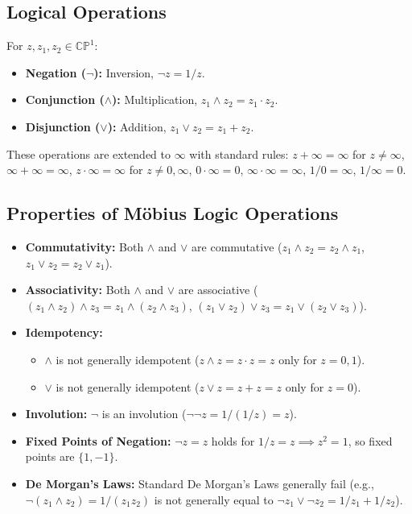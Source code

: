 	\subsection{Logical Operations}
	For $z, z_1, z_2 \in \mathbb{CP}^1$:
	\begin{itemize}
		\item \textbf{Negation ($\neg$):} Inversion, $\neg z = 1/z$.
		\item \textbf{Conjunction ($\wedge$):} Multiplication, $z_1 \wedge z_2 = z_1 \cdot z_2$.
		\item \textbf{Disjunction ($\vee$):} Addition, $z_1 \vee z_2 = z_1 + z_2$.
	\end{itemize}
	These operations are extended to $\infty$ with standard rules: $z+\infty = \infty$ for $z \neq \infty$, $\infty+\infty=\infty$, $z \cdot \infty = \infty$ for $z \neq 0, \infty$, $0 \cdot \infty = 0$, $\infty \cdot \infty = \infty$, $1/0 = \infty$, $1/\infty = 0$.

	\subsection{Properties of Möbius Logic Operations}
	\begin{itemize}
		\item \textbf{Commutativity:} Both $\wedge$ and $\vee$ are commutative ($z_1 \wedge z_2 = z_2 \wedge z_1$, $z_1 \vee z_2 = z_2 \vee z_1$).
		\item \textbf{Associativity:} Both $\wedge$ and $\vee$ are associative ($(z_1 \wedge z_2) \wedge z_3 = z_1 \wedge (z_2 \wedge z_3)$, $(z_1 \vee z_2) \vee z_3 = z_1 \vee (z_2 \vee z_3)$).
		\item \textbf{Idempotency:}
		\begin{itemize}
			\item $\wedge$ is not generally idempotent ($z \wedge z = z \cdot z = z$ only for $z=0, 1$).
			\item $\vee$ is not generally idempotent ($z \vee z = z + z = z$ only for $z=0$).
		\end{itemize}
		\item \textbf{Involution:} $\neg$ is an involution ($\neg \neg z = 1/(1/z) = z$).
		\item \textbf{Fixed Points of Negation:} $\neg z = z$ holds for $1/z = z \implies z^2 = 1$, so fixed points are $\{1, -1\}$.
		\item \textbf{De Morgan's Laws:} Standard De Morgan's Laws generally fail (e.g., $\neg(z_1 \wedge z_2) = 1/(z_1 z_2)$ is not generally equal to $\neg z_1 \vee \neg z_2 = 1/z_1 + 1/z_2$).
	\end{itemize}

